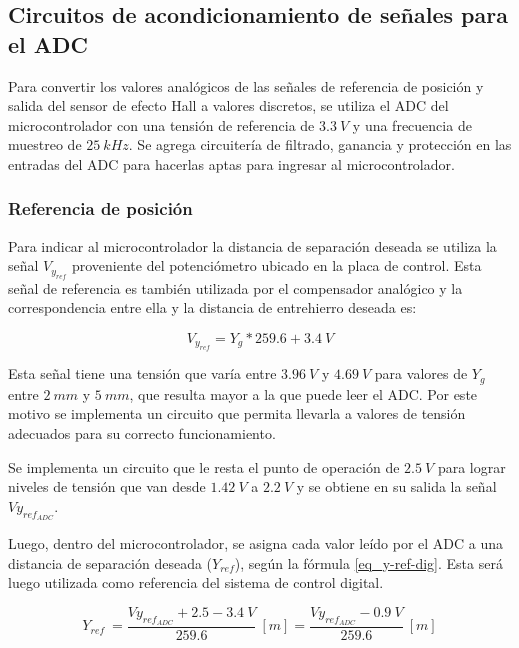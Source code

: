 \subsection{Circuitos de acondicionamiento de señales para el ADC}

 Para convertir los valores analógicos de las señales de referencia de posición y salida del sensor de efecto Hall a valores discretos, se utiliza el ADC del microcontrolador con una tensión de referencia de $3.3\:V$ y una frecuencia de muestreo de $25\:kHz$. Se agrega circuitería de filtrado, ganancia y protección en las entradas del ADC para hacerlas aptas para ingresar al microcontrolador.
 
\subsubsection{Referencia de posición} \label{sec_referencia_pos}

 Para indicar al microcontrolador la distancia de separación deseada se utiliza la señal  $V_{y_{ref}}$ proveniente del potenciómetro ubicado en la placa de control. Esta señal de referencia es también utilizada por el compensador analógico y la correspondencia entre ella y la distancia de entrehierro deseada es:
 
 \begin{equation} \label{eq_vyref_vs_yg}
 	V_{y_{ref}}=Y_g*259.6+3.4\:V
 \end{equation}
 
Esta señal tiene una tensión que varía entre $3.96\:V$ y $4.69\:V$ para valores de $Y_g$ entre $2\:mm$ y $5\:mm$, que resulta mayor a la que puede leer el ADC. Por este motivo se implementa un circuito que permita llevarla a valores de tensión adecuados para su correcto funcionamiento. 

Se implementa un circuito que le resta el punto de operación de $2.5\:V$  para lograr niveles de tensión que van desde $1.42\:V$ a $2.2\:V$ y se obtiene en su salida la señal $Vy_{ref_{ADC}}$.

Luego, dentro del microcontrolador, se asigna cada valor leído por el ADC a una distancia de separación deseada ($Y_{ref}$), según la fórmula \ref{eq_y-ref-dig}. Esta será luego utilizada como referencia del sistema de control digital.

\begin{equation} \label{eq_y-ref-dig}
	Y_{ref}\ =\frac{Vy_{ref_{ADC}} +2.5 - 3.4\:V}{259.6}\:[m]=\frac{Vy_{ref_{ADC}} - 0.9\:V}{259.6}\:[m]
\end{equation}

